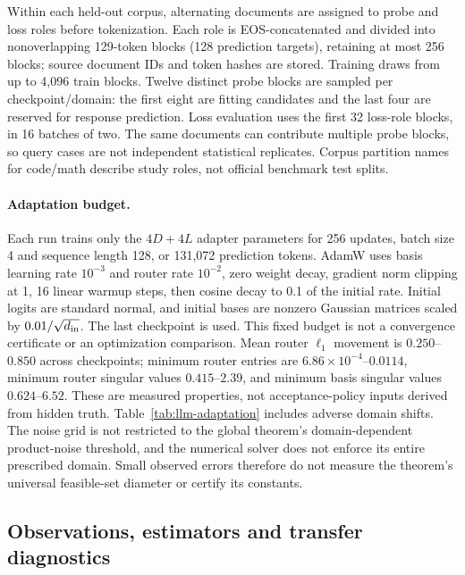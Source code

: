 Within each held-out corpus, alternating documents are assigned to probe
 and loss roles before tokenization. Each role is EOS-concatenated and
 divided into nonoverlapping 129-token blocks (128 prediction targets),
 retaining at most 256 blocks; source document IDs and token hashes are
 stored. Training draws from up to 4,096 train blocks. Twelve distinct
 probe blocks are sampled per checkpoint/domain: the first eight are
 fitting candidates and the last four are reserved for response prediction.
Loss evaluation uses the first 32 loss-role blocks, in 16 batches of two.
The same documents can contribute multiple probe blocks, so query cases
 are not independent statistical replicates. Corpus partition names for
 code/math describe study roles, not official benchmark test splits.

\paragraph{Adaptation budget.}
Each run trains only the $4D+4L$ adapter parameters for 256 updates,
 batch size 4 and sequence length 128, or 131,072 prediction tokens. AdamW uses
 basis learning rate $10^{-3}$ and router rate $10^{-2}$, zero weight decay,
 gradient norm clipping at 1, 16 linear warmup steps, then cosine decay to
0.1 of the initial rate. Initial logits are standard normal, and initial
 bases are nonzero Gaussian matrices scaled by $0.01/\sqrt{d_{\rm in}}$.
The last checkpoint is used. This fixed budget is not a convergence
 certificate or an optimization comparison. Mean router $\ell_1$ movement
 is $0.250$--$0.850$ across checkpoints; minimum router entries are
$6.86\times10^{-4}$--$0.0114$, minimum router singular values
$0.415$--$2.39$, and minimum basis singular values $0.624$--$6.52$.
These are measured properties, not acceptance-policy inputs derived from
hidden truth. Table~\ref{tab:llm-adaptation} includes adverse domain shifts.
The noise grid is not restricted to the global theorem's domain-dependent
 product-noise threshold, and the numerical solver does not enforce its
 entire prescribed domain. Small observed errors therefore do not measure
 the theorem's universal feasible-set diameter or certify its constants.



\subsection{Observations, estimators and transfer diagnostics}

